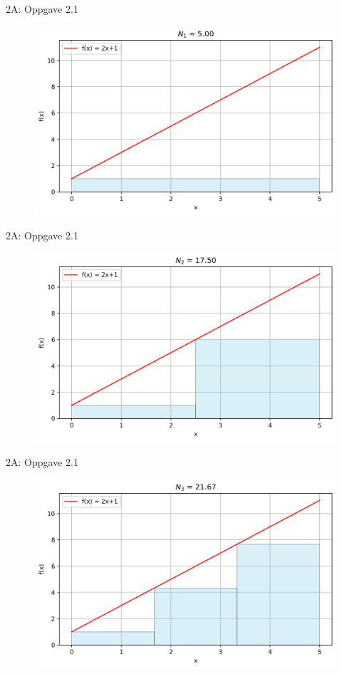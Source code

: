\greenheader
\begin{frame}{2A: Oppgave 2.1}
\begin{figure}
    \centering
    \includegraphics[width=0.8\linewidth]{R2-K2A-101.png}
\end{figure}
\end{frame}

\greenheader
\begin{frame}{2A: Oppgave 2.1}
\begin{figure}
    \centering
    \includegraphics[width=0.8\linewidth]{R2-K2A-121.png}
\end{figure}
\end{frame}

\greenheader
\begin{frame}{2A: Oppgave 2.1}
\begin{figure}
    \centering
    \includegraphics[width=0.8\linewidth]{R2-K2A-131.png}
\end{figure}
\end{frame}

